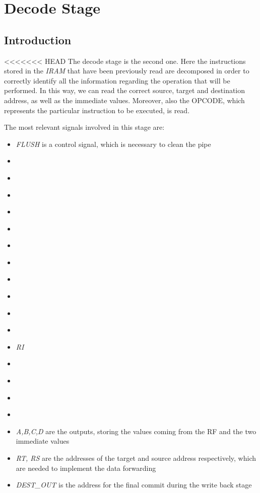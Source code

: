 \section{Decode Stage}
\label{chap_dec}

\subsection{Introduction}
<<<<<<< HEAD
The decode stage is the second one. Here the instructions stored in the \textit{IRAM} that have been previously read are decomposed in order to correctly identify all the information regarding the operation that will be performed. In this way, we can read the correct source, target and destination address, as well as the immediate values. Moreover, also the \textsf{OPCODE}, which represents the particular instruction to be executed, is read.

The most relevant signals involved in this stage are:
\begin{itemize}
	\item \textit{FLUSH} is a control signal, which is necessary to clean the pipe
	\item \textit{}
	\item \textit{}
	\item \textit{}
	\item \textit{}
	\item \textit{}
	\item \textit{}
	\item \textit{}
	\item \textit{}
	\item \textit{}
	\item \textit{}
	\item \textit{}
	\item \textit{RI}
	\item \textit{}
	\item \textit{}
	\item \textit{}
	\item \textit{}
	\item \textit{A,B,C,D} are the outputs, storing the values coming from the \textsf{RF} and the two immediate values
	\item \textit{RT, RS} are the addresses of the target and source address respectively, which are needed to implement the data forwarding
	\item \textit{DEST\_OUT} is the address for the final commit during the write back stage
\end{itemize}

